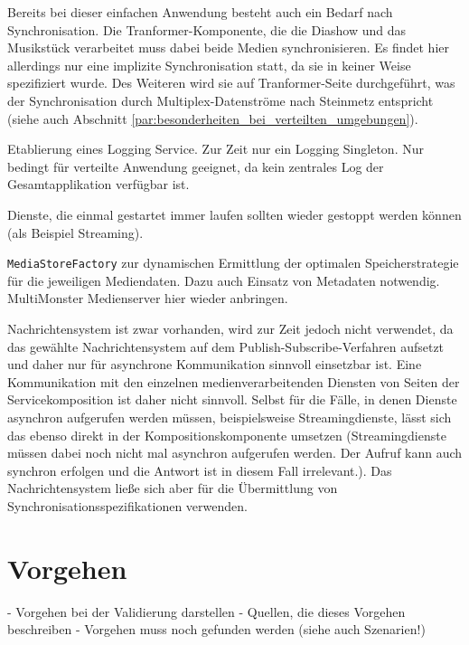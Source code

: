   Bereits bei dieser einfachen Anwendung besteht auch ein Bedarf nach Synchronisation. Die Tranformer-Komponente, die die Diashow und das Musikstück verarbeitet muss dabei beide Medien synchronisieren. Es findet hier allerdings nur eine implizite Synchronisation statt, da sie in keiner Weise spezifiziert wurde. Des Weiteren wird sie auf Tranformer-Seite durchgeführt, was der Synchronisation durch Multiplex-Datenströme nach Steinmetz entspricht~\citep[S. 609]{multimedia_technologie} (siehe auch Abschnitt \ref{par:besonderheiten_bei_verteilten_umgebungen}).
  
  Etablierung eines Logging Service. Zur Zeit nur ein Logging Singleton. Nur bedingt für verteilte Anwendung geeignet, da kein zentrales Log der Gesamtapplikation verfügbar ist.
  
  Dienste, die einmal gestartet immer laufen sollten wieder gestoppt werden können (als Beispiel Streaming).
  
  \verb!MediaStoreFactory! zur dynamischen Ermittlung der optimalen Speicherstrategie für die jeweiligen Mediendaten. Dazu auch Einsatz von Metadaten notwendig. MultiMonster Medienserver hier wieder anbringen.
  
  Nachrichtensystem ist zwar vorhanden, wird zur Zeit jedoch nicht verwendet, da das gewählte Nachrichtensystem auf dem Publish-Subscribe-Verfahren aufsetzt und daher nur für asynchrone Kommunikation sinnvoll einsetzbar ist. Eine Kommunikation mit den einzelnen medienverarbeitenden Diensten von Seiten der Servicekomposition ist daher nicht sinnvoll. Selbst für die Fälle, in denen Dienste asynchron aufgerufen werden müssen, beispielsweise Streamingdienste, lässt sich das ebenso direkt in der Kompositionskomponente umsetzen (Streamingdienste müssen dabei noch nicht mal asynchron aufgerufen werden. Der Aufruf kann auch synchron erfolgen und die Antwort ist in diesem Fall irrelevant.). Das Nachrichtensystem ließe sich aber für die Übermittlung von Synchronisationsspezifikationen verwenden.


\section{Vorgehen} %
\label{sec:vorgehen}

  - Vorgehen bei der Validierung darstellen
  - Quellen, die dieses Vorgehen beschreiben
  - Vorgehen muss noch gefunden werden (siehe auch Szenarien!)
  

